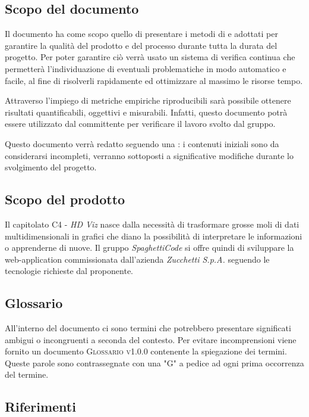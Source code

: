 \documentclass[../piano_di_qualifica.tex]{subfiles}
\begin{document}
\subsection{Scopo del documento}
Il documento ha come scopo quello di presentare i metodi di  e  adottati per garantire la qualità del prodotto e del processo durante tutta la durata del progetto. Per poter garantire ciò verrà usato un sistema di verifica continua che permetterà l'individuazione di eventuali problematiche in modo automatico e facile, al fine di risolverli rapidamente ed ottimizzare al massimo le risorse tempo.

Attraverso l’impiego di metriche empiriche riproducibili sarà possibile ottenere risultati quantificabili, oggettivi e misurabili. Infatti, questo documento potrà essere utilizzato dal committente per verificare il lavoro svolto dal gruppo.

Questo documento verrà redatto seguendo una : i contenuti iniziali sono da considerarsi incompleti, verranno sottoposti a significative modifiche  durante lo svolgimento del progetto.

\subsection{Scopo del prodotto}
Il capitolato C4 - \emph{HD Viz} nasce dalla necessità di trasformare grosse moli di dati multidimensionali in grafici che diano la possibilità di interpretare le informazioni o apprenderne di nuove. Il gruppo \emph{SpaghettiCode} si offre quindi di sviluppare la web-application commissionata dall’azienda \emph{Zucchetti S.p.A.} seguendo le tecnologie richieste dal proponente.

\subsection{Glossario}
All'interno del documento ci sono termini che potrebbero presentare significati ambigui o incongruenti a seconda del contesto. Per evitare incomprensioni viene fornito un documento \textsc{Glossario v1.0.0} contenente la spiegazione dei termini. Queste parole sono contrassegnate con una "G" a pedice ad ogni prima occorrenza del termine.

\subsection{Riferimenti}
\end{document}
